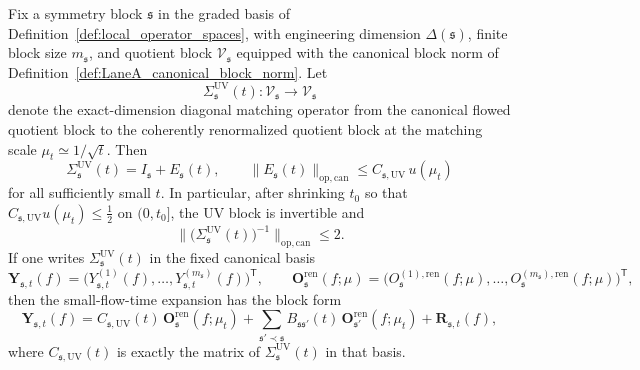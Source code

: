 \begin{proposition}\label{prop:canonical_block_uv_identity}
Fix a symmetry block $\mathfrak s$ in the graded basis of Definition~\ref{def:local_operator_spaces}, with engineering dimension $\Delta(\mathfrak s)$,
finite block size $m_{\mathfrak s}$, and quotient block $\mathscr V_{\mathfrak s}$ equipped with the canonical block norm of Definition~\ref{def:LaneA_canonical_block_norm}.
Let
\[
\Sigma_{\mathfrak s}^{\mathrm{UV}}(t):\mathscr V_{\mathfrak s}\longrightarrow \mathscr V_{\mathfrak s}
\]
denote the exact-dimension diagonal matching operator from the canonical flowed quotient block to the coherently renormalized quotient block at the matching scale $\mu_t\simeq 1/\sqrt t$.
Then
\begin{equation}\label{eq:canonical_block_uv_identity}
\Sigma_{\mathfrak s}^{\mathrm{UV}}(t)=I_{\mathfrak s}+E_{\mathfrak s}(t),
\qquad
\|E_{\mathfrak s}(t)\|_{\mathrm{op,can}}\le C_{\mathfrak s,\mathrm{UV}}\,u(\mu_t)
\end{equation}
for all sufficiently small $t$.
In particular, after shrinking $t_0$ so that $C_{\mathfrak s,\mathrm{UV}}u(\mu_t)\le \tfrac12$ on $(0,t_0]$, the UV block is invertible and
\begin{equation}\label{eq:canonical_block_uv_inv}
\|\big(\Sigma_{\mathfrak s}^{\mathrm{UV}}(t)\big)^{-1}\|_{\mathrm{op,can}}\le 2.
\end{equation}
If one writes $\Sigma_{\mathfrak s}^{\mathrm{UV}}(t)$ in the fixed canonical basis
\[
\mathbf Y_{\mathfrak s,t}(f)
=
\bigl(Y^{(1)}_{\mathfrak s,t}(f),\dots,Y^{(m_{\mathfrak s})}_{\mathfrak s,t}(f)\bigr)^{\mathsf T},
\qquad
\mathbf O_{\mathfrak s}^{\mathrm{ren}}(f;\mu)
=
\bigl(O^{(1),\mathrm{ren}}_{\mathfrak s}(f;\mu),\dots,O^{(m_{\mathfrak s}),\mathrm{ren}}_{\mathfrak s}(f;\mu)\bigr)^{\mathsf T},
\]
then the small-flow-time expansion has the block form
\begin{equation}\label{eq:canonical_block_uv_form}
\mathbf Y_{\mathfrak s,t}(f)
=
C_{\mathfrak s,\mathrm{UV}}(t)\,\mathbf O_{\mathfrak s}^{\mathrm{ren}}(f;\mu_t)
+\sum_{\mathfrak s'\prec \mathfrak s} B_{\mathfrak s\mathfrak s'}(t)\,\mathbf O_{\mathfrak s'}^{\mathrm{ren}}(f;\mu_t)
+\mathbf R_{\mathfrak s,t}(f),
\end{equation}
where $C_{\mathfrak s,\mathrm{UV}}(t)$ is exactly the matrix of $\Sigma_{\mathfrak s}^{\mathrm{UV}}(t)$ in that basis.
\end{proposition}


